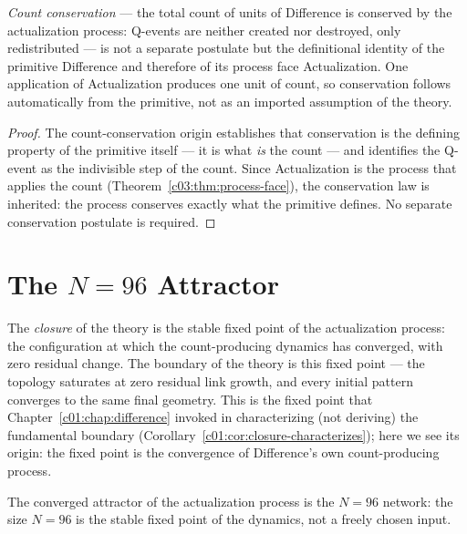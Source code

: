 \begin{theorem}
\label{c03:thm:count-conservation}
\emph{Count conservation} --- the total count of units of Difference is conserved by the
actualization process: Q-events are neither created nor destroyed, only redistributed ---
is not a separate postulate but the definitional identity of the primitive Difference and
therefore of its process face Actualization. One application of Actualization produces one
unit of count, so conservation follows automatically from the primitive, not as an imported
assumption of the theory.
\end{theorem}

\begin{proof}
The count-conservation origin \cite{c03:QG268} establishes that conservation is the defining
property of the primitive itself --- it is what \emph{is} the count --- and identifies the
Q-event as the indivisible step of the count. Since Actualization is the process that
applies the count (Theorem~\ref{c03:thm:process-face}), the conservation law is inherited:
the process conserves exactly what the primitive defines. No separate conservation postulate
is required.
\end{proof}

\section{The \texorpdfstring{$N=96$}{N=96} Attractor}
\label{c03:sec:n96-attractor}

The \emph{closure} of the theory is the stable fixed point of the actualization process: the
configuration at which the count-producing dynamics has converged, with zero residual
change. The boundary of the theory is this fixed point --- the topology saturates at zero
residual link growth, and every initial pattern converges to the same final geometry. This
is the fixed point that Chapter~\ref{c01:chap:difference} invoked in characterizing (not
deriving) the fundamental boundary (Corollary~\ref{c01:cor:closure-characterizes}); here we
see its origin: the fixed point is the convergence of Difference's own count-producing
process.

\begin{theorem}[The attractor is \texorpdfstring{$N=96$}{N=96}]
\label{c03:thm:n96}
The converged attractor of the actualization process is the $N=96$ network: the size $N=96$
is the stable fixed point of the dynamics, not a freely chosen input.
\end{theorem}


